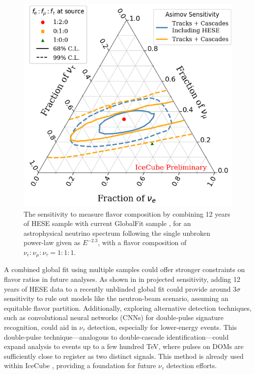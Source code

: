 \begin{figure}[h]
    
    \includegraphics{./figures/results/3D_Combined.png}


    \caption{The sensitivity to measure flavor composition by combining 12 years of HESE sample with current GlobalFit sample \cite{globalfit_icrc}, for an astrophysical neutrino spectrum following the single unbroken power-law given as $E^{-2.3}$, with a flavor composition of $\nu_e : \nu_\mu : \nu_\tau = 1 : 1 : 1$.
    }
\end{figure}

A combined global fit using multiple samples could offer stronger constraints on flavor ratios in future analyses. As shown in  in projected sensitivity, adding 12 years of HESE data to a recently unblinded global fit could provide around $3\sigma$ sensitivity to rule out models like the neutron-beam scenario, assuming an equitable flavor partition. Additionally, exploring alternative detection techniques, such as convolutional neural networks (CNNs) for double-pulse signature recognition, could aid in $\nu_\tau$ detection, especially for lower-energy events. This double-pulse technique—analogous to double-cascade identification—could expand analysis to events up to a few hundred TeV, where pulses on DOMs are sufficiently close to register as two distinct signals. This method is already used within IceCube \cite{CNN_tau}, providing a foundation for future $\nu_\tau$ detection efforts.

